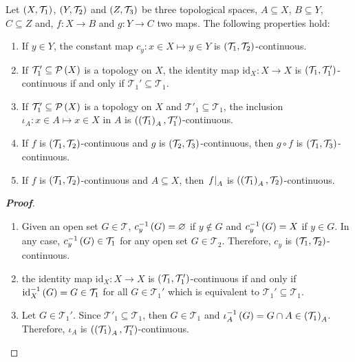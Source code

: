 \begin{proposition}
  Let $\left(X,\mathcal{T}_1\right)$, $\left(Y,\mathcal{T}_2\right)$ and $\left(Z,\mathcal{T}_3\right)$ be three topological spaces, $A\subseteq X$, $B\subseteq Y$, $C\subseteq Z$ and, $f:X\rightarrow B$ and $g:Y\rightarrow C$ two maps. The following properties hold:

  \begin{enumerate}
    \item If $y\in Y$, the constant map $c_y:x\in X\mapsto y\in Y$ is $\left(\mathcal{T}_1,\mathcal{T}_2\right)$-continuous.
    \item If $\mathcal{T}'_1\subseteq\mathcal{P}\left(X\right)$ is a topology on $X$, the identity map $\text{id}_X:X\rightarrow X$ is $\left(\mathcal{T}_1,\mathcal{T}_1'\right)$-continuous if and only if $\mathcal{T}_1'\subseteq\mathcal{T}_1$.
    \item If $\mathcal{T}'_1\subseteq\mathcal{P}\left(X\right)$ is a topology on $X$ and $\mathcal{T}'_1\subseteq\mathcal{T}_1$, the inclusion $\iota_A:x\in A\mapsto x\in X$ in $A$ is $\left(\left(\mathcal{T}_1\right)_A,\mathcal{T}_1'\right)$-continuous.
    \item If $f$ is $\left(\mathcal{T}_1,\mathcal{T}_2\right)$-continuous and $g$ is $\left(\mathcal{T}_2,\mathcal{T}_3\right)$-continuous, then $g\circ f$ is $\left(\mathcal{T}_1,\mathcal{T}_3\right)$-continuous.
    \item If $f$ is $\left(\mathcal{T}_1,\mathcal{T}_2\right)$-continuous and $A\subseteq X$, then $\left.f\right|_{A}$ is $\left(\left(\mathcal{T}_1\right)_A,\mathcal{T}_2\right)$-continuous.
  \end{enumerate}
  \begin{proof}[\rm\textbf{Proof}]
    \hfill
    \begin{enumerate}
      \item Given an open set $G\in\mathcal{T}$, $c_y^{-1}\left(G\right)=\varnothing$ if $y\notin G$ and $c_y^{-1}\left(G\right)=X$ if $y\in G$. In any case, $c_y^{-1}\left(G\right)\in\mathcal{T}_1$ for any open set $G\in\mathcal{T}_2$. Therefore, $c_y$ is $\left(\mathcal{T}_1,\mathcal{T}_2\right)$-continuous.
      \item the identity map $\text{id}_X:X\rightarrow X$ is $\left(\mathcal{T}_1,\mathcal{T}_1'\right)$-continuous if and only if $\text{id}_X^{-1}\left(G\right)=G\in\mathcal{T}_1$ for all $G\in\mathcal{T}_1'$ which is equivalent to $\mathcal{T}_1'\subseteq\mathcal{T}_1$.
      \item Let $G\in\mathcal{T}_1'$. Since $\mathcal{T}'_1\subseteq\mathcal{T}_1$, then $G\in\mathcal{T}_1$ and $\iota_A^{-1}\left(G\right)=G\cap A\in\left(\mathcal{T}_1\right)_A$. Therefore, $\iota_A$ is $\left(\left(\mathcal{T}_1\right)_A,\mathcal{T}'_1\right)$-continuous.

\end{enumerate}
\end{proof}
\end{proposition}
